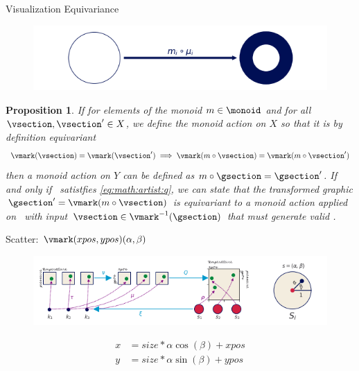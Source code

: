 \documentclass[xcolor={dvipsnames}, handout]{beamer}
\newtheorem{prop}{Proposition} %
\begin{document}
\begin{frame}{Visualization Equivariance}
    \begin{figure}[H]
        \includegraphics[width=\textwidth]{figures/math/diff_type_q.png}
    \end{figure}
    \begin{prop}
        If for elements of the monoid $m \in \monoid$ and for all $\vsection, \vsection^{\prime} \in X$, we define the monoid action on $X$ so that it is by definition equivariant
        \begin{equation}
        \vmark(\vsection) = \vmark(\vsection^{\prime})\implies \vmark(m\circ\vsection) = \vmark(m\circ\vsection^{\prime})
        \label{eq:math:artist:q}
        \end{equation}
        then a monoid action on $Y$ can be defined as $m\circ \gsection = \gsection^{\prime}$. If and only if \vmark\ satistfies \autoref{eq:math:artist:q}, we can state that the transformed graphic $\gsection^{\prime}=\vmark(m\circ \vsection)$ is equivariant to a monoid action applied on \vmark\ with input $\vsection \in \vmark^{-1}(\gsection)$ that must generate valid \gsection. 
    \end{prop}
\end{frame}

\begin{frame}{Scatter: $\vmark(xpos, ypos)(\alpha, \beta)$}
    \begin{figure}[H]
        \includegraphics[width=1\textwidth]{figures/math/scatter.png}
    \end{figure}
    
    \begin{align*}
        x &= size *\alpha \cos(\beta) + xpos \\
        y &= size *\alpha \sin(\beta) + ypos
    \end{align*}    
\end{frame}
\end{document}
